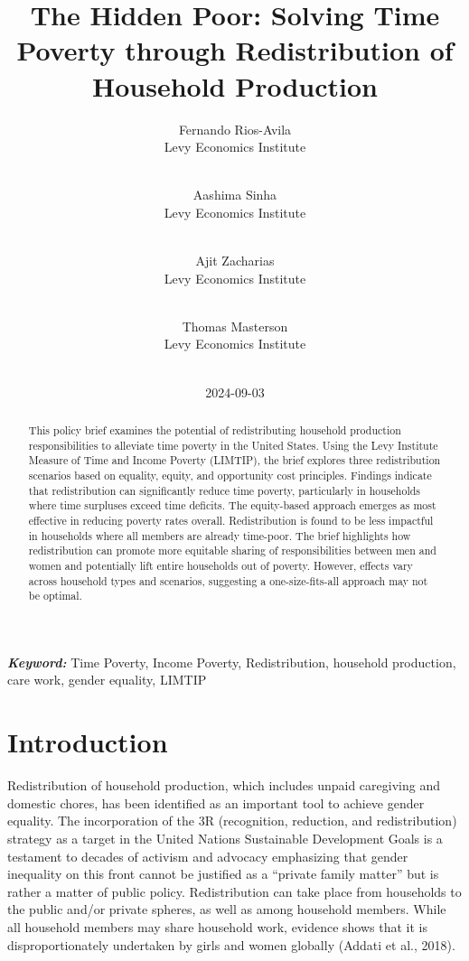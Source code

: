 \documentclass[
  11pt,
]{article}
\title{The Hidden Poor: Solving Time Poverty through Redistribution of
Household Production}
\author{
Fernando Rios-Avila\\
Levy Economics Institute\\
\\
\and 
Aashima Sinha\\
Levy Economics Institute\\
\\
\and 
Ajit Zacharias\\
Levy Economics Institute\\
\\
\and 
Thomas Masterson\\
Levy Economics Institute\\
\\
}
\date{2024-09-03}
\begin{document}
\def\spacingset#1{\renewcommand{\baselinestretch}%
{#1}\small\normalsize} \spacingset{1}


\maketitle
\begin{abstract}
This policy brief examines the potential of redistributing household
production responsibilities to alleviate time poverty in the United
States. Using the Levy Institute Measure of Time and Income Poverty
(LIMTIP), the brief explores three redistribution scenarios based on
equality, equity, and opportunity cost principles. Findings indicate
that redistribution can significantly reduce time poverty, particularly
in households where time surpluses exceed time deficits. The
equity-based approach emerges as most effective in reducing poverty
rates overall. Redistribution is found to be less impactful in
households where all members are already time-poor. The brief highlights
how redistribution can promote more equitable sharing of
responsibilities between men and women and potentially lift entire
households out of poverty. However, effects vary across household types
and scenarios, suggesting a one-size-fits-all approach may not be
optimal.
\end{abstract}
 
\vspace{.2in}

\textbf{\textit{Keyword: }}Time Poverty, Income Poverty, Redistribution,
household production, care work, gender equality, LIMTIP


\thispagestyle{empty}
\clearpage{}
\newpage
\spacingset{1.2} %
\section{Introduction}\label{introduction}

Redistribution of household production, which includes unpaid caregiving
and domestic chores, has been identified as an important tool to achieve
gender equality. The incorporation of the 3R (recognition, reduction,
and redistribution) strategy as a target in the United Nations
Sustainable Development Goals is a testament to decades of activism and
advocacy emphasizing that gender inequality on this front cannot be
justified as a ``private family matter'' but is rather a matter of
public policy. Redistribution can take place from households to the
public and/or private spheres, as well as among household members. While
all household members may share household work, evidence shows that it
is disproportionately undertaken by girls and women globally (Addati et
al., 2018).
\end{document}

